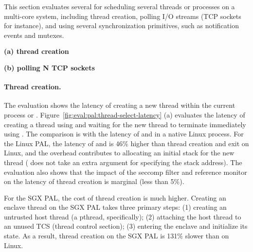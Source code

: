 This section evaluates several \hostapis{} for scheduling several threads or processes
on a multi-core system,
including thread creation, polling I/O streams (TCP sockets for instance), and using several synchronization primitives,
such as notification events and mutexes. 


\begin{figure*}[t!]
\centering
\footnotesize
{}
\parbox{0.49\textwidth}{\centering\bf (a) thread creation}
\parbox{0.49\textwidth}{\centering\bf (b) polling N TCP sockets}
\caption{(a) Thread creation latency and (b) latency of polling a number of TCP sockets.
Lower is better.
The comparison is between (1)  and  on Linux; (2)  and  on the Linux PAL, with and without a \seccomp{} filter ({\bf +SC}) and reference monitor ({\bf +RM}); (3) the same \hostapis{} on the SGX PAL.}
\label{fig:eval:pal:thread-select-latency}
\end{figure*}


\paragraph{Thread creation.}
The evaluation shows the latency of creating a new thread within the current process or \picoproc{}.
Figure~\ref{fig:eval:pal:thread-select-latency} (a)
evaluates the latency of creating a thread using  and waiting for the new thread to terminate immediately using .
The comparison is with the latency of 
and  in a native Linux process.
For the Linux PAL,
the latency of  and  is \roughly{}46\% higher
than thread creation and exit on Linux,
and the overhead contributes
to allocating an initial stack for the new thread ( does not take an extra argument for specifying the stack address).
The evaluation also shows that the impact of the seccomp{} filter and reference monitor on the latency of thread creation is marginal (less than 5\%).

For the SGX PAL, the cost of thread creation is much higher.
Creating an enclave thread on the SGX PAL takes three primary steps: (1) creating an untrusted host thread (a pthread, specifically); (2) attaching the host thread to an unused TCS (thread control section); (3) entering the enclave and initialize its state.
As a result, thread creation on the SGX PAL is \roughly{}131\% slower than  on Linux.




